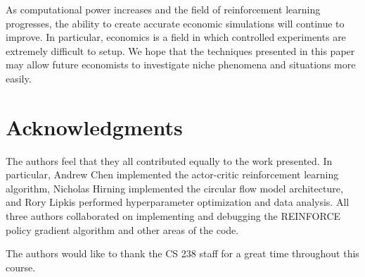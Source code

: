 \documentclass[twoside,twocolumn]{article}
\begin{document}
As computational power increases and the field of reinforcement learning progresses, the ability to create accurate economic simulations will continue to improve. In particular, economics is a field in which controlled experiments are extremely difficult to setup. We hope that the techniques presented in this paper may allow future economists to investigate niche phenomena and situations more easily.



\section{Acknowledgments}

The authors feel that they all contributed equally to the work presented. In particular, Andrew Chen implemented the actor-critic reinforcement learning algorithm, Nicholas Hirning implemented the circular flow model architecture, and Rory Lipkis performed hyperparameter optimization and data analysis. All three authors collaborated on implementing and debugging the REINFORCE policy gradient algorithm and other areas of the code. 

\medskip

The authors would like to thank the CS 238 staff for a great time throughout this course.





\end{document}
